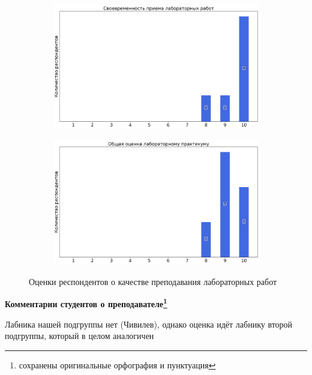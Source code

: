 \begin{figure}[H]
\begin{subfigure}[b]{0.45\textwidth}
                \includegraphics[width=\textwidth]{images/1 course/Общая физика - механика/labniks-marks-Титов А.С.-2.png}
            \end{subfigure}
            \begin{subfigure}[b]{0.45\textwidth}
                \centering
                \includegraphics[width=\textwidth]{images/1 course/Общая физика - механика/labniks-marks-Титов А.С.-3.png}
            \end{subfigure}	
            \caption{Оценки респондентов о качестве преподавания лабораторных работ}
        \end{figure}

        \textbf{Комментарии студентов о преподавателе\protect\footnote{сохранены оригинальные орфография и пунктуация}}
            \begin{commentbox} 
                Лабника нашей подгруппы нет (Чивилев), однако оценка идёт лабнику второй подгруппы, который в целом аналогичен  
            \end{commentbox} 
        
